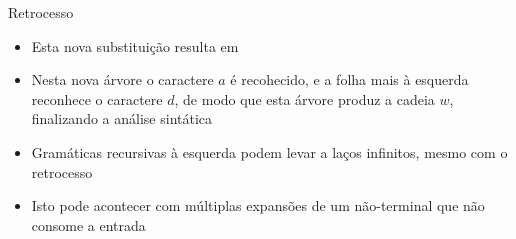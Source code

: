 \begin{frame}[fragile]{Retrocesso}

    \begin{itemize}
        \item Esta nova substituição resulta em
        \begin{center}
        \end{center}

        \item Nesta nova árvore o caractere $a$ é recohecido, e a folha mais à esquerda reconhece o caractere $d$, de modo que esta árvore produz a cadeia $w$,
            finalizando a análise sintática

        \item Gramáticas recursivas à esquerda podem levar a laços infinitos, mesmo com o retrocesso

        \item Isto pode acontecer com múltiplas expansões de um não-terminal que não consome a entrada
    \end{itemize}
\end{frame}

